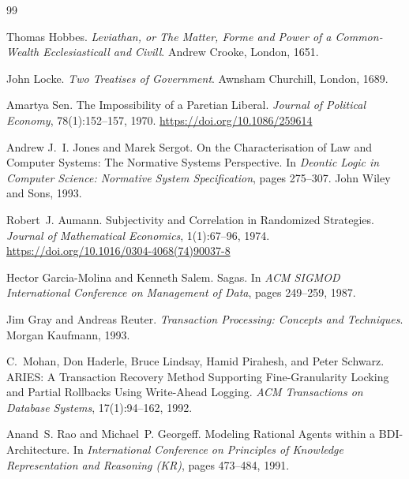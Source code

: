 \documentclass[11pt,a4paper]{article}
\theoremstyle{definition}
\theoremstyle{remark}
\begin{document}

\pdprintsolutions
\begin{thebibliography}{99}

Thomas Hobbes.
\newblock \textit{Leviathan, or The Matter, Forme and Power of a Common-Wealth Ecclesiasticall and Civill}.
\newblock Andrew Crooke, London, 1651.

John Locke.
\newblock \textit{Two Treatises of Government}.
\newblock Awnsham Churchill, London, 1689.

Amartya Sen.
\newblock The Impossibility of a Paretian Liberal.
\newblock \textit{Journal of Political Economy}, 78(1):152--157, 1970.
\newblock \url{https://doi.org/10.1086/259614}

Andrew J.~I. Jones and Marek Sergot.
\newblock On the Characterisation of Law and Computer Systems: The Normative Systems Perspective.
\newblock In \textit{Deontic Logic in Computer Science: Normative System Specification}, pages 275--307. John Wiley and Sons, 1993.

Robert~J. Aumann.
\newblock Subjectivity and Correlation in Randomized Strategies.
\newblock \textit{Journal of Mathematical Economics}, 1(1):67--96, 1974.
\newblock \url{https://doi.org/10.1016/0304-4068(74)90037-8}

Hector Garcia-Molina and Kenneth Salem.
\newblock Sagas.
\newblock In \textit{ACM SIGMOD International Conference on Management of Data}, pages 249--259, 1987.

Jim Gray and Andreas Reuter.
\newblock \textit{Transaction Processing: Concepts and Techniques}.
\newblock Morgan Kaufmann, 1993.

C.~Mohan, Don Haderle, Bruce Lindsay, Hamid Pirahesh, and Peter Schwarz.
\newblock ARIES: A Transaction Recovery Method Supporting Fine-Granularity Locking and Partial Rollbacks Using Write-Ahead Logging.
\newblock \textit{ACM Transactions on Database Systems}, 17(1):94--162, 1992.

Anand~S. Rao and Michael~P. Georgeff.
\newblock Modeling Rational Agents within a BDI-Architecture.
\newblock In \textit{International Conference on Principles of Knowledge Representation and Reasoning (KR)}, pages 473--484, 1991.


\end{thebibliography}
\end{document}
